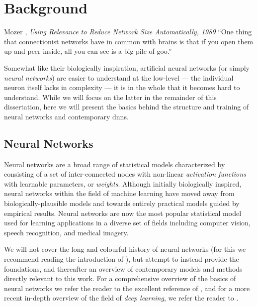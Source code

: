 \documentclass[thesis]{subfiles}
\begin{document}
\chapter{Background}
\label{background}
\begin{chapquote}{Mozer \etal, \textit{Using Relevance to Reduce Network Size Automatically, 1989}}
    ``One thing that connectionist networks have in common with brains is that if you open them up and peer inside, all you can see is a big pile of goo.''
\end{chapquote}
Somewhat like their biologically inspiration, artificial neural networks (or simply \emph{neural networks}) are easier to understand at the low-level --- the individual neuron itself lacks in complexity --- it is in the whole that it becomes hard to understand. While we will focus on the latter in the remainder of this dissertation, here we will present the basics behind the structure and training of neural networks and contemporary \glspl{dnn}.

\section{Neural Networks}
Neural networks are a broad range of statistical models characterized by consisting of a set of inter-connected nodes with non-linear \emph{activation functions} with learnable parameters, or \emph{weights}.
 Although initially biologically inspired, neural networks within the field of machine learning have moved away from biologically-plausible models and towards entirely practical models guided by empirical results. Neural networks are now the most popular statistical model used for learning applications in a diverse set of fields including computer vision, speech recognition, and medical imagery. 

We will not cover the long and colourful history of neural networks (for this we recommend reading the introduction of \citet{goodfellow2016deep}), but attempt to instead provide the foundations, and thereafter an overview of contemporary models and methods directly relevant to this work. For a comprehensive overview of the basics of neural networks we refer the reader to the excellent reference of \citet{Bishop1995}, and for a more recent  in-depth overview of the field of \emph{deep learning}, we refer the reader to \citet{goodfellow2016deep}. 
\end{document}
